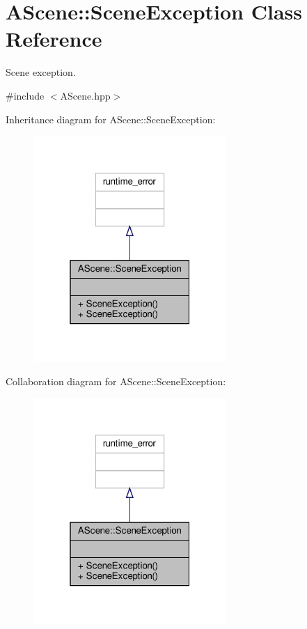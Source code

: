 \hypertarget{class_a_scene_1_1_scene_exception}{}\section{A\+Scene\+:\+:Scene\+Exception Class Reference}
\label{class_a_scene_1_1_scene_exception}


Scene exception.  




{\ttfamily \#include $<$A\+Scene.\+hpp$>$}



Inheritance diagram for A\+Scene\+:\+:Scene\+Exception\+:
\nopagebreak
\begin{figure}[H]
\begin{center}
\leavevmode
\includegraphics[width=208pt]{class_a_scene_1_1_scene_exception__inherit__graph}
\end{center}
\end{figure}


Collaboration diagram for A\+Scene\+:\+:Scene\+Exception\+:
\nopagebreak
\begin{figure}[H]
\begin{center}
\leavevmode
\includegraphics[width=208pt]{class_a_scene_1_1_scene_exception__coll__graph}
\end{center}
\end{figure}
